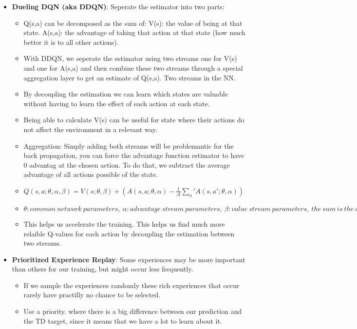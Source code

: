 \begin{itemize}[noitemsep,nolistsep]
\begin{itemize}
	\end{itemize} 
	\item \textbf{Dueling DQN (aka DDQN)}: Seperate the estimator into two parts:
	\begin{itemize}[noitemsep,nolistsep]
		\item Q(s,a) can be decomposed as the sum of: V(s): the value of being at that state. A(s,a): the advantage of taking that action at that state (how much better it is to all other actions).
		\item With DDQN, we seperate the estimator using two streams one for V(s) and one for A(s,a) and then combine these two streams through a special aggregation layer to get an estimate of Q(s,a). Two streams in the NN.
		\item By decoupling the estimation we can learn which states are valuable without having to learn the effect of each action at each state.
		\item Being able to calculate V(s) can be useful for state where their actions do not affect the environment in a relevant way.
		\item Aggregation: Simply adding both streams will be problemantic for the back propagation, you can force the advantage function estimator to have 0 advantag at the chosen action. To do that, we subtract the average advantage of all actions possible of the state.
		\item $Q(s,a;\theta,\alpha,\beta) = V(s;\theta,\beta) + (A(s,a;\theta,\alpha) - \frac{1}{\mathcal{A}}\sum_a' A(s,a';\theta,\alpha))$
		\item $\theta: common\ network\ parameters,\ \alpha: advantage\ stream\ parameters,\ \beta: value\ stream\ parameters,\ the\ sum\ is\ the\ average.$
		\item This helps us accelerate the training. This helps us find much more relaible Q-values for each action by decoupling the estimation between two streams.
	\end{itemize} 
	\item \textbf{Prioritized Experience Replay}: Some experiences may be more important than others for our training, but might occur less frequently.
	\begin{itemize}[noitemsep,nolistsep]
		\item If we sample the experiences randomly these rich experiences that occur rarely have practilly no chance to be selected.
		\item Use a priority. where there is a big difference between our prediction and the TD target, since it means that we have a lot to learn about it.

\end{itemize}
\end{itemize}
